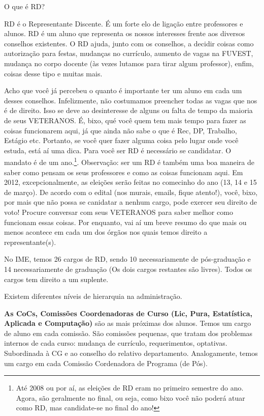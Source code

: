 \begin{secao}{O que é RD?}

RD é o Representante Discente. É um forte elo de ligação entre professores e
alunos. RD é um aluno que representa os nossos interesses frente aos diversos
conselhos existentes. O RD ajuda, junto com os conselhos, a decidir coisas como
autorização para festas, mudanças no currículo, aumento de vagas na FUVEST,
mudança no corpo docente (às vezes lutamos para tirar algum professor), enfim,
coisas desse tipo e muitas mais.

Acho que você já percebeu o quanto é importante ter um aluno em cada um desses
conselhos. Infelizmente, não costumamos preencher todas as vagas que nos é de
direito. Isso se deve ao desinteresse de alguns ou  falta de tempo da maioria
de seus VETERANOS. É, bixo, qué você quem tem mais tempo para fazer as coisas
funcionarem aqui, já que ainda não sabe o que é Rec, DP, Trabalho, Estágio etc.
Portanto, se você quer fazer alguma coisa pelo lugar onde você estuda, está aí
uma dica. Para você ser RD é necessário se candidatar. O mandato é de um
ano.\footnote{Até 2008 ou por aí, as eleições de RD eram no primeiro semestre
do ano. Agora, são geralmente no final, ou seja, como bixo você não poderá
atuar como RD, mas candidate-se no final do ano!}. Observação: ser um RD é
também uma boa maneira de saber como pensam os seus professores e como as
coisas funcionam aqui.
Em 2012, excepcionalmente, as eleições serão feitas no comecinho do ano (13, 14
e 15 de março). De acordo com o edital (nos murais, emails, fique atento!),
você, bixo, por mais que não possa se canidatar a nenhum cargo, pode exercer
seu direito de voto! Procure conversar com seus VETERANOS para saber melhor
como funcionam essas coisas. Por enquanto, vai aí um breve resumo do que mais
ou menos acontece em cada um dos órgãos nos quais temos direito a
representante(s).

No IME, temos 26 cargos de RD, sendo 10 necessariamente de pós-graduação e 14
necessariamente de graduação (Os dois cargos restantes são livres). Todos os
cargos tem direito a um suplente.

Existem diferentes níveis de hierarquia na administração.

{\bf As CoCs,
Comissões Coordenadoras de Curso (Lic, Pura, Estatística, Aplicada e
Computação)} são as mais próximas dos alunos. Temos um cargo de aluno em cada
comissão. São comissões pequenas, que tratam dos problemas internos de cada
curso: mudança de currículo, requerimentos, optativas. Subordinada à CG e ao
conselho do relativo departamento. Analogamente, temos um cargo em cada
Comissão Cordenadora de Programa (de Pós).


\end{secao}
